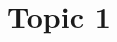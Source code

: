 \documentclass{article}
\begin{document}
\tableofcontents
\newpage

\section{Topic 1}
\newpage
\end{document}
